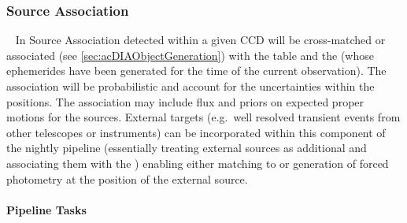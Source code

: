 \subsubsection{Source Association}~
\label{sec:apSourceAssoc}
In Source Association \DIASources detected within a given CCD will be cross-matched or associated (see \ref{sec:acDIAObjectGeneration}) with the \DIAObject table and the \SSObjects (whose ephemerides have been generated for the time of the current observation). The association will be probabilistic  and account for the uncertainties within the positions. The association may include flux and priors on expected proper motions for the sources. External targets (e.g.\ well resolved transient events from other telescopes or instruments) can be incorporated within this component of the nightly pipeline (essentially treating external sources as additional \DIAObjects and associating them with the \DIASources) enabling either matching to \DIASources or generation of forced photometry at the position of the external source. 

\paragraph{Pipeline Tasks}

